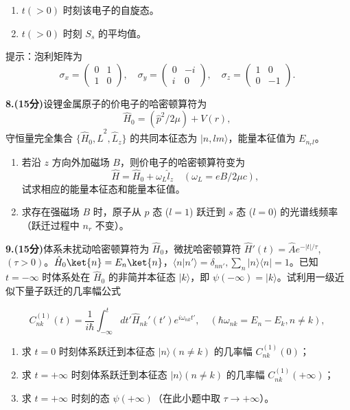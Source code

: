 \begin{enumerate}
    \item $t(>0)$ 时刻该电子的自旋态。
    \item $t(>0)$ 时刻 $S_s$ 的平均值。
\end{enumerate}

提示：泡利矩阵为
\[
\sigma_x = \begin{pmatrix}
0 & 1 \\
1 & 0
\end{pmatrix}, \quad
\sigma_y = \begin{pmatrix}
0 & -i \\
i & 0
\end{pmatrix}, \quad
\sigma_z = \begin{pmatrix}
1 & 0 \\
0 & -1
\end{pmatrix}.~
\]

\textbf{8.(15分)}设锂金属原子的价电子的哈密顿算符为 
\[
\hat{H}_0 = (\hat{p}^2/2\mu) + V(r),~
\]
守恒量完全集合 $\{\hat{H}_0, \hat{L}^2, \hat{L}_z\}$ 的共同本征态为 $\lvert n,l m \rangle$，能量本征值为 $E_{n_rl}$。

\begin{enumerate}
    \item 若沿 $z$ 方向外加磁场 $B$，则价电子的哈密顿算符变为 
    \[
    \hat{H} = \hat{H}_0 + \omega_L \hat{l}_z \quad (\omega_L = eB/2\mu c),~
    \]
    试求相应的能量本征态和能量本征值。
    
    \item 求存在强磁场 $B$ 时，原子从 $p$ 态 ($l = 1$) 跃迁到 $s$ 态 ($l = 0$) 的光谱线频率（跃迁过程中 $n_r$ 不变）。
\end{enumerate}

\textbf{9.(15分)}体系未扰动哈密顿算符为 $\hat{H}_0$，微扰哈密顿算符 $\hat{H}'(t) = \hat{A} e^{-|t|/\tau}$, $(\tau > 0)$。$\hat{H}_0\ket{n} = E_n \ket{n}$，$\langle n \lvert n' \rangle = \delta_{nn'},\sum_n |n\rangle \langle n| = 1$。已知 $t = -\infty$ 时体系处在 $\hat{H}_0$ 的非简并本征态 $\lvert k \rangle$，即 $\psi(-\infty) = \lvert k \rangle$。试利用一级近似下量子跃迁的几率幅公式

\[
C_{nk}^{(1)}(t) = \frac{1}{i\hbar} \int_{-\infty}^{t} dt' \hat{H}_{nk}'(t') e^{i\omega_{nk}t'}, \quad (\hbar \omega_{nk} = E_n - E_k, n \neq k),~
\]

\begin{enumerate}
    \item 求 $t = 0$ 时刻体系跃迁到本征态 $\lvert n \rangle (n \neq k)$ 的几率幅 $C_{nk}^{(1)}(0)$；
    \item 求 $t = +\infty$ 时刻体系跃迁到本征态 $\lvert n \rangle (n \neq k)$ 的几率幅 $C_{nk}^{(1)}(+\infty)$；
    \item 求 $t = +\infty$ 时刻的态 $\psi(+\infty)$（在此小题中取 $\tau \to +\infty$）。
\end{enumerate}

